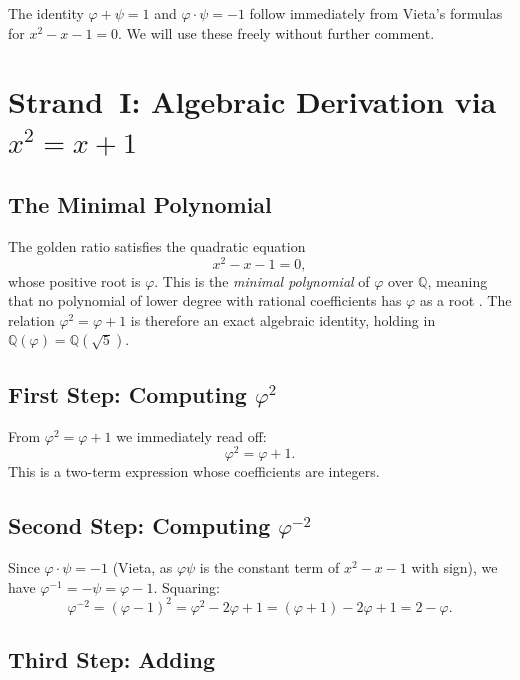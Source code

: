 The identity $\varphi + \psi = 1$ and $\varphi \cdot \psi = -1$
follow immediately from Vieta's formulas for $x^{2}-x-1=0$.
We will use these freely without further comment.


\section{Strand~I: Algebraic Derivation via $x^{2}=x+1$}%
\label{sec:strand-I-algebraic}

\subsection{The Minimal Polynomial}

The golden ratio satisfies the quadratic equation
\[
  x^{2} - x - 1 = 0,
\]
whose positive root is $\varphi$.
This is the \emph{minimal polynomial} of $\varphi$ over $\mathbb{Q}$,
meaning that no polynomial of lower degree with rational coefficients
has $\varphi$ as a root \cite{koshy_fib_lucas}.
The relation $\varphi^{2} = \varphi + 1$ is therefore an exact
algebraic identity, holding in $\mathbb{Q}(\varphi) =
\mathbb{Q}(\sqrt{5})$.

\subsection{First Step: Computing $\varphi^{2}$}

From $\varphi^{2} = \varphi + 1$ we immediately read off:
\[
  \varphi^{2} = \varphi + 1.
\]
This is a two-term expression whose coefficients are integers.

\subsection{Second Step: Computing $\varphi^{-2}$}

Since $\varphi \cdot \psi = -1$ (Vieta, as $\varphi\psi$ is the
constant term of $x^{2}-x-1$ with sign), we have
$\varphi^{-1} = -\psi = \varphi - 1$.
Squaring:
\[
  \varphi^{-2}
  = (\varphi - 1)^{2}
  = \varphi^{2} - 2\varphi + 1
  = (\varphi + 1) - 2\varphi + 1
  = 2 - \varphi.
\]

\subsection{Third Step: Adding}

